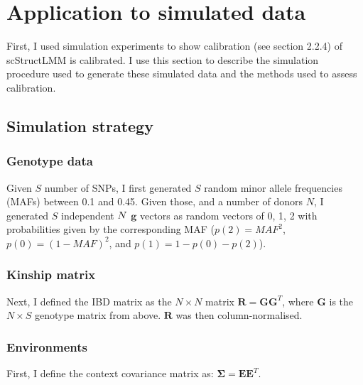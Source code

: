 \section{Application to simulated data}


First, I used simulation experiments to show calibration (see section 
2.2.4) of scStructLMM is calibrated.
I use this section to describe the simulation procedure used to generate these simulated data and the methods used to assess calibration.

\subsection{Simulation strategy}

\subsubsection{Genotype data}

Given $S$ number of SNPs, I first generated $S$ random minor allele frequencies (MAFs) between 0.1 and 0.45.
Given those, and a number of donors $N$, I generated $S$ independent $N \time 1$ $\mathbf{g}$ vectors as random vectors of 0, 1, 2 with probabilities given by the corresponding MAF ($p(2) = MAF^2$, $p(0) = (1-MAF)^2$, and $p(1) = 1 - p(0) - p(2)$).  

\subsubsection{Kinship matrix}

Next, I defined the IBD matrix as the $N \times N$ matrix $\mathbf{R} = \mathbf{G}\mathbf{G}^T$, where $\mathbf{G}$ is the $N \times S$ genotype matrix from above.
$\mathbf{R}$ was then column-normalised.

\subsubsection{Environments}

First, I define the context covariance matrix as:
$\boldsymbol{\Sigma} = \mathbf{E}\mathbf{E}^T$.

